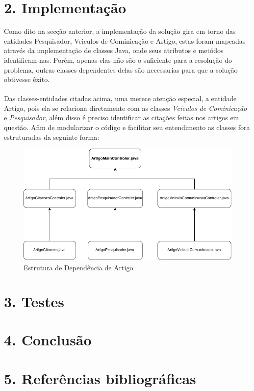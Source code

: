 \documentclass[12pt, a4paper]{article}
\begin{document}
\section*{2. Implementação}
  Como dito na secção anterior, a implementação da solução gira em torno das entidades Pesquisador, Veiculos de Cominicação e Artigo, estas foram mapeadas através da implementação de classes Java, onde seus atributos e metódos identificam-nas. Porém, apenas elas não são o suficiente para a resolução do problema, outras classes dependentes delas são necessarias para que a solução obtivesse êxito. \\\\
  Das classes-entidades citadas acima, uma merece atenção especial, a entidade Artigo, pois ela se relaciona diretamente com as classes \textit{Veiculos de Cominicação} e \textit{Pesquisador}, além disso é preciso identificar as citações feitas nos artigos em questão. Afim de modularizar o código e facilitar seu entendimento as classes fora estruturadas da seguinte forma:

  \begin{figure}[!htb]
   \centering
    \includegraphics[scale=0.5]{Artigo}
    \caption{Estrutura de Dependência de Artigo}
   \label{Rotulo}
  \end{figure}


\section*{3. Testes}

\section*{4. Conclusão}


\section*{5. Referências bibliográficas}
\end{document}
